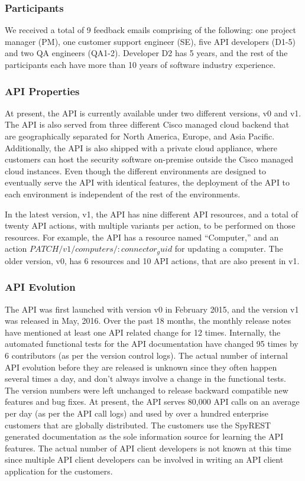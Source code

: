 \documentclass[10pt, conference]{IEEEtran}
\begin{document}
\subsubsection{Participants}
We received a total of 9 feedback emails comprising of the following: one project manager (PM), one customer support engineer (SE), five API developers (D1-5) and two QA engineers (QA1-2). Developer D2 has 5 years, and the rest of the participants each have more than 10 years of software industry experience.

\subsubsection{API Properties} %
At present, the API is currently available under two different versions, v0 and v1. The API is also served from three different Cisco managed cloud backend that are geographically separated for North America, Europe, and Asia Pacific. Additionally, the API is also shipped with a private cloud appliance, where customers can host the security software on-premise outside the Cisco managed cloud instances. Even though the different environments are designed to eventually serve the API with identical features, the deployment of the API to each environment is independent of the rest of the environments.

In the latest version, v1, the API has nine different API resources, and a total of twenty API actions, with multiple variants per action, to be performed on those resources. For example, the API has a resource named ``Computer,'' and an action $PATCH /v1/computers/{:connector_guid}$ for updating a computer. The older version, v0, has 6 resources and 10 API actions, that are also present in v1.

\subsubsection{API Evolution}
The API was first launched with version v0 in February 2015, and the version v1 was released in May, 2016. Over the past 18 months, the monthly release notes have mentioned at least one API related change for 12 times. Internally, the automated functional tests for the API documentation have changed 95 times by 6 contributors (as per the version control logs). The actual number of internal API evolution before they are released is unknown since they often happen several times a day, and don't always involve a change in the functional tests. The version numbers were left unchanged to release backward compatible new features and bug fixes. At present, the API serves 80,000 API calls on an average per day (as per the API call logs) and used by over a hundred enterprise customers that are globally distributed. The customers use the SpyREST generated documentation as the sole information source for learning the API features. The actual number of API client developers is not known at this time since multiple API client developers can be involved in writing an API client application for the customers.
\end{document}
